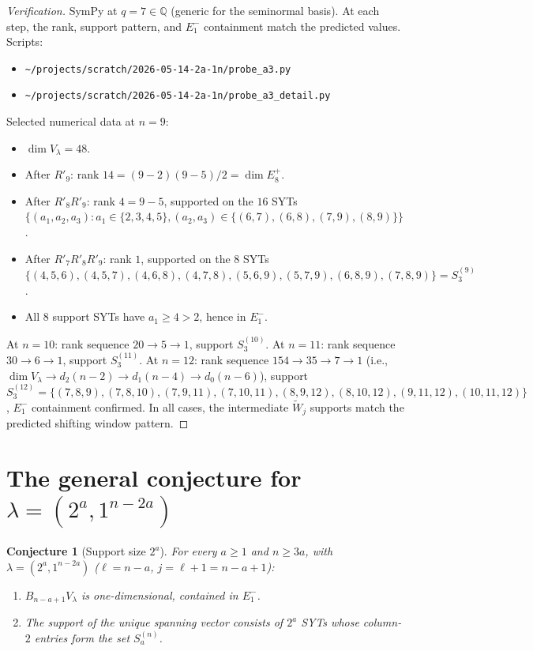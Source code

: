 \documentclass[11pt]{article}
\newtheorem{conjecture}[theorem]{Conjecture}
\theoremstyle{definition}
\begin{document}
\begin{proof}[Verification]
SymPy at $q=7\in\mathbb{Q}$ (generic for the seminormal basis).
At each step, the rank, support pattern, and $E_1^-$ containment
match the predicted values.  Scripts:
\begin{itemize}[leftmargin=2em,topsep=0.3em,itemsep=0.2em]
\item \texttt{\textasciitilde/projects/scratch/2026-05-14-2a-1n/probe\_a3.py}
\item \texttt{\textasciitilde/projects/scratch/2026-05-14-2a-1n/probe\_a3\_detail.py}
\end{itemize}

Selected numerical data at $n=9$:
\begin{itemize}[leftmargin=2em,topsep=0.3em,itemsep=0.2em]
\item $\dim V_\lambda=48$.
\item After $R'_9$: rank $14=(9{-}2)(9{-}5)/2=\dim E_8^+$.
\item After $R'_8R'_9$: rank $4=9-5$, supported on the $16$ SYTs
$\{(a_1,a_2,a_3):a_1\in\{2,3,4,5\},(a_2,a_3)\in
\{(6,7),(6,8),(7,9),(8,9)\}\}$.
\item After $R'_7R'_8R'_9$: rank $1$, supported on the $8$ SYTs
$\{(4,5,6),(4,5,7),(4,6,8),(4,7,8),
(5,6,9),(5,7,9),(6,8,9),(7,8,9)\}=S_3^{(9)}$.
\item All $8$ support SYTs have $a_1\ge 4>2$, hence in $E_1^-$.
\end{itemize}

At $n=10$: rank sequence $20\to 5\to 1$, support $S_3^{(10)}$.
At $n=11$: rank sequence $30\to 6\to 1$, support $S_3^{(11)}$.
At $n=12$: rank sequence $154\to 35\to 7\to 1$ (i.e., $\dim V_\lambda
\to d_2(n{-}2)\to d_1(n{-}4)\to d_0(n{-}6)$), support $S_3^{(12)}=
\{(7,8,9),(7,8,10),(7,9,11),(7,10,11),
(8,9,12),(8,10,12),(9,11,12),(10,11,12)\}$, $E_1^-$ containment
confirmed.  In all cases, the intermediate $\widetilde{W}_j$
supports match the predicted shifting window pattern.
\end{proof}

\section{The general conjecture for $\lambda=(2^a,1^{n-2a})$}

\begin{conjecture}[Support size $2^a$]\label{conj:2a}
For every $a\ge 1$ and $n\ge 3a$, with $\lambda=(2^a,1^{n-2a})$
($\ell=n-a$, $j=\ell+1=n-a+1$):
\begin{enumerate}[leftmargin=2em,topsep=0.3em,itemsep=0.2em]
\item $B_{n-a+1}V_\lambda$ is one-dimensional, contained in $E_1^-$.
\item The support of the unique spanning vector consists of
$2^a$ SYTs whose column-$2$ entries form the set $S_a^{(n)}$.
\end{enumerate}
\end{conjecture}
\end{document}
